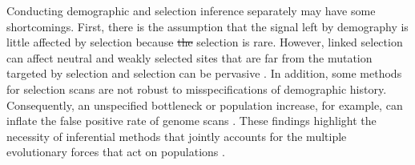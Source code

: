 \documentclass[a4paper, 12pt]{article}
\providecommand{\DIFdeltex}[1]{{\protect\color{red}\sout{#1}}}                      %
\providecommand{\DIFdelbegin}{} %
\providecommand{\DIFdelend}{} %
\providecommand{\DIFdel}[1]{\texorpdfstring{\DIFdeltex{#1}}{}} %
\newcommand{\DIFscaledelfig}{0.5}
\newlength{\DIFdelgraphicswidth} %
\newlength{\DIFdelgraphicsheight} %
\newcommand{\DIFdelincludegraphics}[2][]{%
\sbox{\DIFdelgraphicsbox}{\DIFOincludegraphics[#1]{#2}}%
\settoboxwidth{\DIFdelgraphicswidth}{\DIFdelgraphicsbox} %
\settoboxtotalheight{\DIFdelgraphicsheight}{\DIFdelgraphicsbox} %
\scalebox{\DIFscaledelfig}{%
\parbox[b]{\DIFdelgraphicswidth}{\usebox{\DIFdelgraphicsbox}\\[-\baselineskip] \rule{\DIFdelgraphicswidth}{0em}}\llap{\resizebox{\DIFdelgraphicswidth}{\DIFdelgraphicsheight}{%
\setlength{\unitlength}{\DIFdelgraphicswidth}%
\begin{picture}(1,1)%
\thicklines\linethickness{2pt} %
{\color[rgb]{1,0,0}\put(0,0){\framebox(1,1){}}}%
{\color[rgb]{1,0,0}\put(0,0){\line( 1,1){1}}}%
{\color[rgb]{1,0,0}\put(0,1){\line(1,-1){1}}}%
\end{picture}%
}\hspace*{3pt}}} %
} %
\DeclareRobustCommand{\DIFdelbegin}{\DIFOdelbegin \let\includegraphics\DIFdelincludegraphics} %
\DeclareRobustCommand{\DIFdelend}{\DIFOaddend \let\includegraphics\DIFOincludegraphics} %
\begin{document}
Conducting demographic and selection inference separately may have some shortcomings. First, there is the assumption that the signal left by demography is little affected by selection because \DIFdelbegin \DIFdel{the }\DIFdelend selection is rare. However, linked selection can affect neutral and weakly selected sites that are far from the mutation targeted by selection \citep{Sella:2009hs, Neher:2013ju} and selection can be pervasive \citep{Sella:2009hs, Lange:2018fl}. In addition, some methods for selection scans are not robust to misspecifications of demographic history. Consequently, an unspecified bottleneck or population increase, for example, can inflate the false positive rate of genome scans \citep{Jensen:2005ky, Jensen:2007jw, Schrider:2016gg}. These findings highlight the necessity of inferential methods that jointly accounts for the multiple evolutionary forces that act on populations \citep{Lin:2011jv, Li:2012bh, Bank:2014hx}. 
\end{document}
